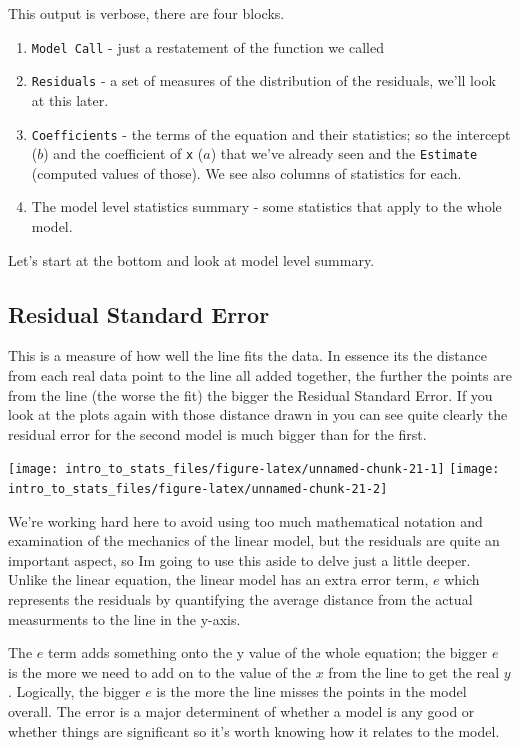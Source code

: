 \documentclass[
]{book}
\providecommand{\tightlist}{%
  \setlength{\itemsep}{0pt}\setlength{\parskip}{0pt}}
\newenvironment{sidenote}
{ \begin{tcolorbox}[colbacktitle=blue!50!white,
title=huh?,coltitle=white,
fonttitle=\bfseries] }
{  \end{tcolorbox} }
\begin{document}
This output is verbose, there are four blocks.

\begin{enumerate}
\def\labelenumi{\arabic{enumi}.}
\tightlist
\item
  \texttt{Model\ Call} - just a restatement of the function we called
\item
  \texttt{Residuals} - a set of measures of the distribution of the residuals, we'll look at this later.
\item
  \texttt{Coefficients} - the terms of the equation and their statistics; so the intercept (\(b\)) and the coefficient of \texttt{x} (\(a\)) that we've already seen and the \texttt{Estimate} (computed values of those). We see also columns of statistics for each.
\item
  The model level statistics summary - some statistics that apply to the whole model.
\end{enumerate}

Let's start at the bottom and look at model level summary.

\hypertarget{residual-standard-error}{%
\subsection{Residual Standard Error}\label{residual-standard-error}}

This is a measure of how well the line fits the data. In essence its the distance from each real data point to the line all added together, the further the points are from the line (the worse the fit) the bigger the Residual Standard Error. If you look at the plots again with those distance drawn in you can see quite clearly the residual error for the second model is much bigger than for the first.

\texttt{[image: intro\_to\_stats\_files/figure-latex/unnamed-chunk-21-1]} \texttt{[image: intro\_to\_stats\_files/figure-latex/unnamed-chunk-21-2]}

\begin{sidenote}
We're working hard here to avoid using too much mathematical notation and examination of the mechanics of the linear model, but the residuals are quite an important aspect, so Im going to use this aside to delve just a little deeper. Unlike the linear equation, the linear model has an extra error term, \(e\) which represents the residuals by quantifying the average distance from the actual measurments to the line in the y-axis.

The \(e\) term adds something onto the y value of the whole equation; the bigger \(e\) is the more we need to add on to the value of the \(x\) from the line to get the real \(y\). Logically, the bigger \(e\) is the more the line misses the points in the model overall. The error is a major determinent of whether a model is any good or whether things are significant so it's worth knowing how it relates to the model.
\end{sidenote}
\end{document}
